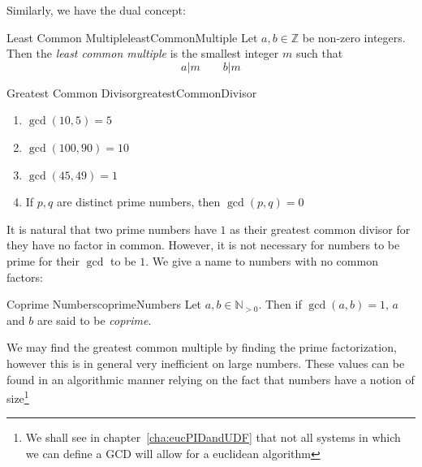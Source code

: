 \documentclass{book}
\newcommand{\N}{{\mathbb{N}}}
\newcommand{\Z}{{\mathbb{Z}}}
\renewcommand{\mid}{\big|}
\begin{document}
Similarly, we have the dual concept:

\begin{defn}{Least Common Multiple}{leastCommonMultiple}
	Let $a, b \in \Z$ be non-zero integers. Then the \emph{least common multiple} is the smallest integer $m$ such that
	\[
		a \mid m \qquad b \mid m
	\]
\end{defn}

\begin{example}{Greatest Common Divisor}{greatestCommonDivisor}
	\begin{enumerate}
		\item $\gcd(10,5) = 5$
		\item $\gcd(100, 90) = 10$
		\item $\gcd(45, 49) = 1$
		\item If $p,q$ are distinct prime numbers, then $\gcd(p,q) = 0$
	\end{enumerate}
\end{example}

It is natural that two prime numbers have $1$ as their greatest common divisor for they have no factor in
common. However, it is not necessary for numbers to be prime for their $\gcd$ to be $1$. We give a name to
numbers with no common factors:

\begin{defn}{Coprime Numbers}{coprimeNumbers}
	Let $a,b \in \N_{>0}$. Then if $\gcd(a,b) = 1$, $a$ and $b$ are said to be \emph{coprime}.
\end{defn}


We may find the greatest common multiple by finding the prime factorization, however this is in general very
inefficient on large numbers. These values can be found in an algorithmic manner relying on the fact that
numbers have a notion of size\footnote{We shall see in chapter~\ref{cha:eucPIDandUDF} that not all systems in
which we can define a GCD will allow for a euclidean algorithm}
\end{document}
